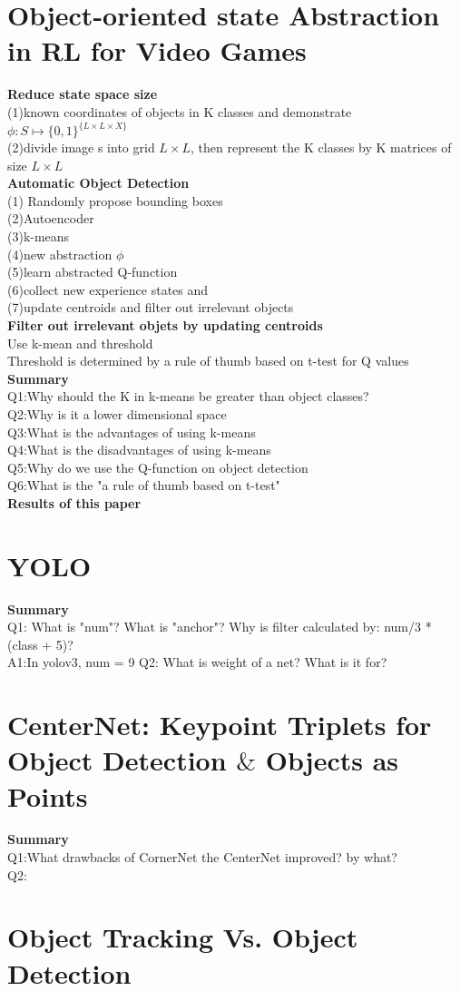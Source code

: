 \section{Object-oriented state Abstraction in RL for Video Games}
\textbf{Reduce state space size}\\
(1)known coordinates of objects in K classes and demonstrate $\phi :S\mapsto \{0,1\} ^{\{L\times L\times X\}}$\\
(2)divide image s into grid $L\times L$, then represent the K classes by K matrices of size $L\times L$\\
\textbf{Automatic Object Detection}\\
(1) Randomly propose bounding boxes\\
(2)Autoencoder\\
(3)k-means\\
(4)new abstraction $\phi$\\
(5)learn abstracted Q-function\\
(6)collect new experience states and\\
(7)update centroids and filter out irrelevant objects\\
\textbf{Filter out irrelevant objets by updating centroids}\\
Use k-mean and threshold\\
Threshold is determined by a rule of thumb based on t-test for Q values
\textbf{Summary}\\
Q1:Why should the K in k-means be greater than object classes?\\
Q2:Why is it a lower dimensional space\\
Q3:What is the advantages of using k-means\\
Q4:What is the disadvantages of using k-means\\
Q5:Why do we use the Q-function on object detection\\
Q6:What is the "a rule of thumb based on t-test"\\
\textbf{Results of this paper}\\

\section{YOLO}
\textbf{Summary}\\
Q1: What is "num"? What is "anchor"? Why is filter calculated by: num/3 * (class + 5)?\\
A1:In yolov3, num = 9
Q2: What is weight of a net? What is it for?\\

\section{CenterNet: Keypoint Triplets for Object Detection $\&$ Objects as Points}
\textbf{Summary}\\
Q1:What drawbacks of CornerNet the CenterNet improved? by what?\\
Q2:\\

\section{Object Tracking Vs. Object Detection}